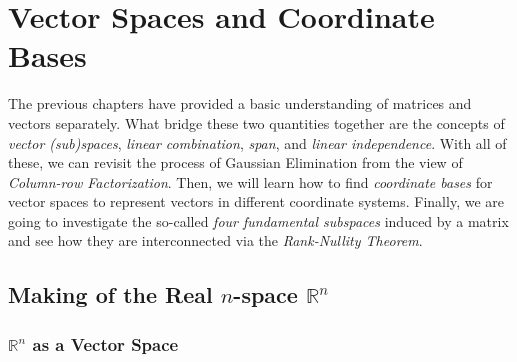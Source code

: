 \chapter{Vector Spaces and Coordinate Bases}
\label{chap:vec_space}

The previous chapters have provided a basic understanding of matrices and vectors separately. What bridge these two quantities together are the concepts of \textit{vector (sub)spaces}, \textit{linear combination}, \textit{span}, and \textit{linear independence}. With all of these, we can revisit the process of Gaussian Elimination from the view of \textit{Column-row Factorization}. Then, we will learn how to find \textit{coordinate bases} for vector spaces to represent vectors in different coordinate systems. Finally, we are going to investigate the so-called \textit{four fundamental subspaces} induced by a matrix and see how they are interconnected via the \textit{Rank-Nullity Theorem}.

\section{Making of the Real $n$-space $\mathbb{R}^n$}

\subsection{$\mathbb{R}^n$ as a Vector Space}

